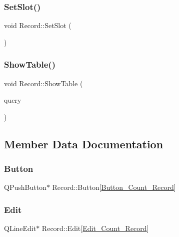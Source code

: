 \mbox{\label{class_record_acc7b3423b809a15465c21f51353392d5}} 
\subsubsection{\texorpdfstring{SetSlot()}{SetSlot()}}
{\footnotesize\ttfamily void Record\+::\+Set\+Slot (\begin{DoxyParamCaption}{ }\end{DoxyParamCaption})}

\mbox{\label{class_record_aa1e340f0b1a776819d30d23c1424cbd2}} 
\subsubsection{\texorpdfstring{ShowTable()}{ShowTable()}}
{\footnotesize\ttfamily void Record\+::\+Show\+Table (\begin{DoxyParamCaption}\item[{Q\+Sql\+Query}]{query }\end{DoxyParamCaption})}



\subsection{Member Data Documentation}
\mbox{\label{class_record_a5fa1d68f3e8af5da355a3d4ac4340876}} 
\subsubsection{\texorpdfstring{Button}{Button}}
{\footnotesize\ttfamily Q\+Push\+Button$\ast$ Record\+::\+Button\mbox{[}\mbox{\hyperlink{record_8h_a4d319c985ecf15ec7ce151eea6e5f25e}{Button\+\_\+\+Count\+\_\+\+Record}}\mbox{]}\hspace{0.3cm}{\ttfamily [private]}}

\mbox{\label{class_record_ae969d53f57dbc379816588b35c17e58f}} 
\subsubsection{\texorpdfstring{Edit}{Edit}}
{\footnotesize\ttfamily Q\+Line\+Edit$\ast$ Record\+::\+Edit\mbox{[}\mbox{\hyperlink{record_8h_a02fbceef67a55fc0f21a7b2516ff47b3}{Edit\+\_\+\+Count\+\_\+\+Record}}\mbox{]}\hspace{0.3cm}{\ttfamily [private]}}


